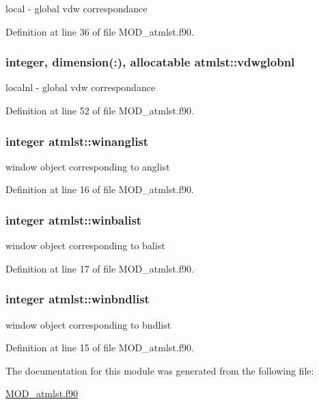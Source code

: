 local -\/ global vdw correspondance 



Definition at line 36 of file M\-O\-D\-\_\-atmlst.\-f90.

\hypertarget{classatmlst_ab9b4d4c497ef4f8f710514366b06cd8f}{
\subsubsection[{vdwglobnl}]{\setlength{\rightskip}{0pt plus 5cm}integer, dimension(\-:), allocatable atmlst\-::vdwglobnl}}\label{classatmlst_ab9b4d4c497ef4f8f710514366b06cd8f}


localnl -\/ global vdw correspondance 



Definition at line 52 of file M\-O\-D\-\_\-atmlst.\-f90.

\hypertarget{classatmlst_ad4e86e855fb683fa5fc99d128e30b344}{
\subsubsection[{winanglist}]{\setlength{\rightskip}{0pt plus 5cm}integer atmlst\-::winanglist}}\label{classatmlst_ad4e86e855fb683fa5fc99d128e30b344}


window object corresponding to anglist 



Definition at line 16 of file M\-O\-D\-\_\-atmlst.\-f90.

\hypertarget{classatmlst_ab14088e45057cf6a5761d15903693729}{
\subsubsection[{winbalist}]{\setlength{\rightskip}{0pt plus 5cm}integer atmlst\-::winbalist}}\label{classatmlst_ab14088e45057cf6a5761d15903693729}


window object corresponding to balist 



Definition at line 17 of file M\-O\-D\-\_\-atmlst.\-f90.

\hypertarget{classatmlst_a960c43f79324985305533ec872e970d4}{
\subsubsection[{winbndlist}]{\setlength{\rightskip}{0pt plus 5cm}integer atmlst\-::winbndlist}}\label{classatmlst_a960c43f79324985305533ec872e970d4}


window object corresponding to bndlist 



Definition at line 15 of file M\-O\-D\-\_\-atmlst.\-f90.



The documentation for this module was generated from the following file\-:\begin{DoxyCompactItemize}
\item 
\hyperlink{MOD__atmlst_8f90}{M\-O\-D\-\_\-atmlst.\-f90}\end{DoxyCompactItemize}
